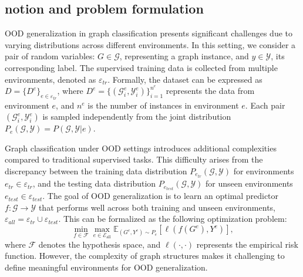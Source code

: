 \subsection{notion and problem formulation}
OOD generalization in graph classification presents significant challenges due to varying distributions across different environments.  In this setting, we consider a pair of random variables: $G \in \mathcal{G}$, representing a graph instance, and $y \in \mathcal{Y}$, its corresponding label. The supervised training data is collected from multiple environments, denoted as $\varepsilon_{tr}$. Formally, the dataset can be expressed as $D = \{D^{e}\}_{e \in \varepsilon_{tr}}$, where $D^{e} =\{(\mathcal{G}^{e}_{i},\mathcal{Y}^{e}_{i})\}^{n^{e}}_{i=1}$  represents the data from environment $e$, and $n^e$ is the number of instances in environment $e$. Each pair $(\mathcal{G}^{e}_{i}, \mathcal{Y}^{e}_{i})$ is sampled independently from the joint distribution $P_{e}(\mathcal{G}, \mathcal{Y}) = P(\mathcal{G}, \mathcal{Y} | e)$.



Graph classification under OOD settings introduces additional complexities compared to traditional supervised tasks. This difficulty arises from the discrepancy between the training data distribution $P_{e_{tr}}(\mathcal{G}, \mathcal{Y})$ for environments $e_{tr} \in \varepsilon_{tr}$, and the testing data distribution $P_{e_{test}}(\mathcal{G}, \mathcal{Y})$ for unseen environments $e_{test} \in \varepsilon_{test}$. The goal of OOD generalization is to learn an optimal predictor $f: \mathcal{G} \rightarrow \mathcal{Y}$ that performs well across both training and unseen environments, $\varepsilon_{all} = \varepsilon_{tr} \cup \varepsilon_{test}$. This can be formalized as the following optimization problem: 
\begin{equation}
\label{eq: OOD_target} \min_{f \in \mathcal{F}} \max_{e \in \mathcal{E}_{\mathrm{all}}} \mathbb{E}_{(G^{e}, Y^{e}) \sim P_{e}}[\ell(f(G^e), Y^e)], 
\end{equation}
where $\mathcal{F}$ denotes the hypothesis space, and $\ell(\cdot,\cdot)$ represents the empirical risk function. However, the complexity of graph structures makes it challenging to define meaningful environments for OOD generalization.


